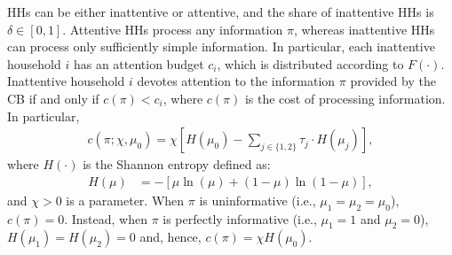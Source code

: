 \documentclass[12pt,a4paper]{article}
\begin{document}
HHs can be either inattentive or attentive, and the share of inattentive HHs is $\delta\in[0,1]$. Attentive HHs process any information $\pi$, whereas inattentive HHs can process only sufficiently simple information. In particular, each inattentive household $i$ has an attention budget $c_i$, which is distributed according to $F(\cdot)$. Inattentive household $i$ devotes attention to the information $\pi$ provided by the CB if and only if $c(\pi)<c_i$, where $c(\pi)$ is the cost of processing information. In particular,
\begin{align}
\label{cost}
    c(\pi; \chi, \mu_0) = \chi\left[H(\mu_0)-\sum_{j \in \{1,2\}}\tau_j \cdot H(\mu_j)\right],
\end{align}
where $H(\cdot)$ is the Shannon entropy defined as:
\begin{align}
    H(\mu) & = -\left[ \mu\ln(\mu) + (1-\mu)\ln(1-\mu) \right],
\end{align}
and $\chi>0$ is a parameter. When $\pi$ is uninformative (i.e., $\mu_1=\mu_2 = \mu_0$), $c(\pi)=0$. Instead, when $\pi$ is perfectly informative (i.e., $\mu_1=1$ and $\mu_2=0$), $H(\mu_1)=H(\mu_2)=0$ and, hence, $c(\pi)=\chi H(\mu_0)$. 
\end{document}
